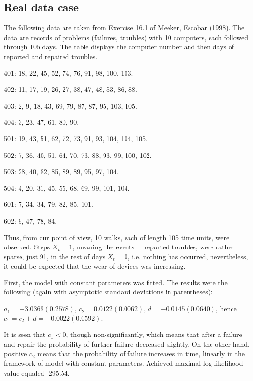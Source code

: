 \documentclass[11pt]{article}
\begin{document}
\subsection{Real data case}

The following data are taken from Exercise 16.1 of Meeker, Escobar
(1998). The data are records of problems (failures, troubles) with
10 computers, each followed through 105 days. The table displays
the computer number and then days of reported and repaired
troubles.

\medskip

   401: 18, 22, 45, 52, 74, 76, 91, 98, 100, 103.

   402: 11, 17, 19, 26, 27, 38, 47, 48, 53, 86, 88.

   403: 2, 9, 18, 43, 69, 79, 87, 87, 95, 103, 105.

   404: 3, 23, 47, 61, 80, 90.

   501: 19, 43, 51, 62, 72, 73, 91, 93, 104, 104, 105.

   502: 7, 36, 40, 51, 64, 70, 73, 88, 93, 99, 100, 102.

   503: 28, 40, 82, 85, 89, 89, 95, 97, 104.

   504: 4, 20, 31, 45, 55, 68, 69, 99, 101, 104.

   601: 7, 34, 34, 79, 82, 85, 101.

   602: 9, 47, 78, 84.

\medskip

Thus, from our point of view, 10 walks, each of length 105 time
units, were observed. Steps $X_t=1$, meaning the events = reported
troubles, were rather sparse, just 91, in the rest of days
$X_t=0$, i.e. nothing has occurred, nevertheless, it could be
expected that the wear of devices was increasing.

First, the model with constant parameters was fitted. The results
were the following (again with asymptotic standard deviations in
parentheses):

$ a_1=-3.0368 (0.2578),\,c_2=0.0122 (0.0062),\, d=-0.0145
(0.0640)$,
hence $c_1 =  c_2 + d = -0.0022 (0.0592)$.

It is seen that $c_1<0$, though non-significantly, which means
that after a failure and repair the probability of further failure
decreased slightly. On the other hand, positive $c_2$ means that
the probability of failure increases in time, linearly in the
framework of model with constant parameters. Achieved maximal log-likelihood value
equaled -295.54.
\end{document}
